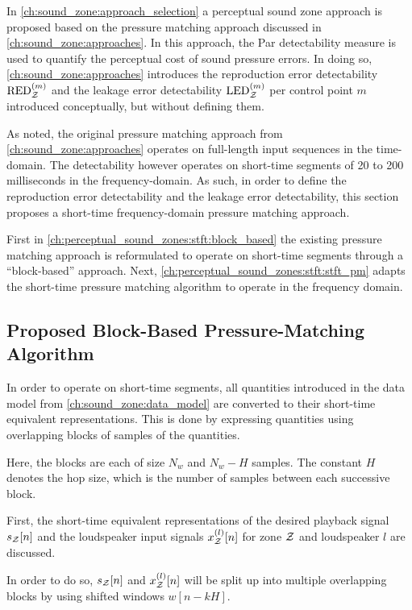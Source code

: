 In \autoref{ch:sound_zone:approach_selection} a perceptual sound zone approach is proposed based on the pressure matching approach discussed in \autoref{ch:sound_zone:approaches}.
In this approach, the Par detectability measure is used to quantify the perceptual cost of sound pressure errors.
In doing so, \autoref{ch:sound_zone:approaches} introduces the reproduction error detectability 
$\text{RED}_{\mathcal{Z}}^{(m)}$ and the leakage error detectability $\text{LED}_{\mathcal{Z}}^{(m)}$
per control point $m$ introduced conceptually, but without defining them.

As noted, the original pressure matching approach from \autoref{ch:sound_zone:approaches} operates on full-length input sequences in the time-domain.
The detectability however operates on short-time segments of 20 to 200 milliseconds in the frequency-domain.
As such, in order to define the reproduction error detectability and the leakage error detectability, this section proposes a short-time
frequency-domain pressure matching approach.

First in \autoref{ch:perceptual_sound_zones:stft:block_based} the existing pressure matching approach is reformulated to operate on 
short-time segments through a ``block-based'' approach. 
Next, \autoref{ch:perceptual_sound_zones:stft:stft_pm} adapts the short-time pressure matching algorithm to operate in the frequency domain. 

\subsection{Proposed Block-Based Pressure-Matching Algorithm}
\label{ch:perceptual_sound_zones:stft:block_based}
In order to operate on short-time segments, all quantities introduced in the data model from \autoref{ch:sound_zone:data_model}
are converted to their short-time equivalent representations.
This is done by expressing quantities using overlapping blocks of samples of the quantities.

Here, the blocks are each of size $N_w$ and $N_w - H$ samples.
The constant $H$ denotes the hop size, which is the number of samples between each successive block.

First, the short-time equivalent representations of the desired playback signal $s_{\mathcal{Z}}[n]$ and the loudspeaker input
signals $x^{(l)}_{\mathcal{Z}}[n]$ for zone $\mathcal{Z}$ and loudspeaker $l$ are discussed.

In order to do so, $s_{\mathcal{Z}}[n]$ and $x^{(l)}_{\mathcal{Z}}[n]$ will be split up into multiple overlapping blocks by using shifted windows $w[n - kH]$. 

